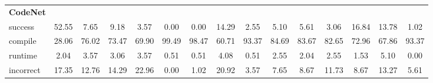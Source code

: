 \begin{table}[t]
\begin{tabular}{@{}lcccccccccccccc@{}}
\textbf{CodeNet} & & & & & & & & & & & & & & \\ 
\quad success & 52.55 & 7.65 & 9.18 & 3.57 & 0.00 & 0.00 & 14.29 & 2.55 & 5.10 & 5.61 & 3.06 & 16.84 & 13.78 & 1.02 \\
\qquad compile & 28.06 & 76.02 & 73.47 & 69.90 & 99.49 & 98.47 & 60.71 & 93.37 & 84.69 & 83.67 & 82.65 & 72.96 & 67.86 & 93.37 \\
\qquad runtime & 2.04 & 3.57 & 3.06 & 3.57 & 0.51 & 0.51 & 4.08 & 0.51 & 2.55 & 2.04 & 2.55 & 1.53 & 5.10 & 0.00 \\
\qquad incorrect & 17.35 & 12.76 & 14.29 & 22.96 & 0.00 & 1.02 & 20.92 & 3.57 & 7.65 & 8.67 & 11.73 & 8.67 & 13.27 & 5.61 \\
 

\bottomrule
\end{tabular}
\end{table}




